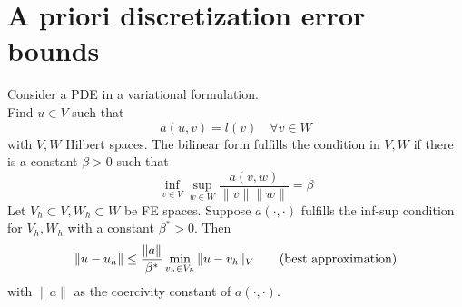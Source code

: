\chapter{A priori discretization error bounds}
Consider a PDE in a variational formulation.\\
Find $u \in V$ such that
\begin{equation*}
	a(u,v) = l(v) \quad \forall v \in W
\end{equation*}
with $V,W$ Hilbert spaces.\nl
The bilinear form fulfills the  condition in $V,W$ if there is a constant $\beta > 0$ such that
\begin{equation*}
	\inf_{v\in V}\sup_{w\in W}\frac{a(v,w)}{ \|v\| \|w\|} = \beta
\end{equation*}
Let $V_{h}\subset V,W_{h}\subset W$ be FE spaces.
Suppose $a(\cdot,\cdot)$ fulfills the inf-sup condition for $V_{h},W_{h}$ with a constant $\beta^*> 0$. 
Then 
\begin{equation*}\label{bestapprox}
	\|u - u_{h}\| \leq \frac{ \|a\|}{\beta^*} \min_{v_{h} \in V_{h}} \|u -v_{h}\|_{V} \tag{\text{best approximation}}
\end{equation*}
with $ \|a\|$ as the coercivity constant of $a(\cdot,\cdot)$.\nl

